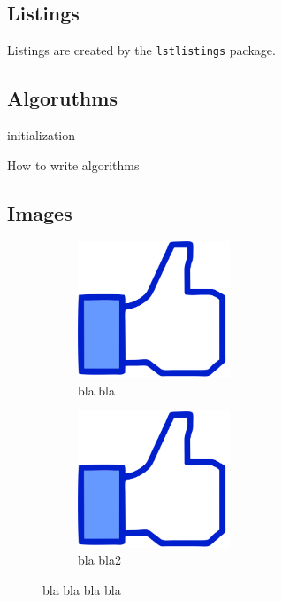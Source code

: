 \subsection{Listings}
Listings are created by the \texttt{lstlistings} package.


\citationneeded


\subsection{Algoruthms}
\begin{algorithm}[H]
    \SetAlgoLined
    initialization\;
    \caption{How to write algorithms}
\end{algorithm}


\subsection{Images}

\begin{figure}[H]
    \begin{subfigure}{0.3\textwidth}
        \centering
        \includegraphics[width=0.5\textwidth]{chapters/Beispiel/images/thumbs_up.jpg}
        \caption[blabla\quad - Bildquelle: \cite{}]{bla bla}
        \label{}
    \end{subfigure}%
    \begin{subfigure}{0.7\textwidth}
        \centering
        \includegraphics[width=0.5\textwidth]{chapters/Beispiel/images/thumbs_up.jpg}
        \caption[blabla2 \quad - Bildquelle: \cite{hsv1}]{bla bla2}
        \label{f}
    \end{subfigure}%
    \caption[bla bla bla bla]{bla bla bla bla}
\end{figure}
